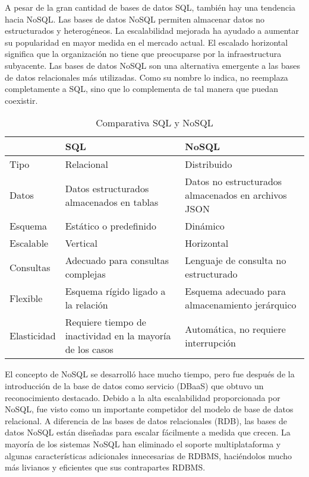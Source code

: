 A pesar de la gran cantidad de bases de datos SQL, también hay una tendencia hacia NoSQL. Las bases de datos NoSQL permiten almacenar datos no estructurados y heterogéneos. La \gls{escalabilidad} mejorada ha ayudado a aumentar su popularidad en mayor medida en el mercado actual. El escalado horizontal significa que la organización no tiene que preocuparse por la infraestructura subyacente. Las bases de datos NoSQL son una alternativa emergente a las bases de datos relacionales más utilizadas. Como su nombre lo indica, no reemplaza completamente a SQL, sino que lo complementa de tal manera que puedan coexistir.
\vspace{0.8cm}

\begin{table}[H]
  \renewcommand{\arraystretch}{1.5}
  \centering
  \scriptsize
  \begin{tabular}{ |p{2cm}||p{5cm}|p{5cm}|  }
    \hline
      & SQL
      & NoSQL \\
    \hline
    Tipo
      & Relacional
      & Distribuido \\
    \hline
    Datos
      & Datos estructurados almacenados en tablas 
      & Datos no estructurados almacenados en archivos JSON \\
    \hline
    Esquema 
      & Estático o predefinido
      & Dinámico \\
    \hline
    Escalable 
      & Vertical
      & Horizontal \\
    \hline
    Consultas
      & Adecuado para consultas complejas 
      & Lenguaje de consulta no estructurado \\
    \hline
    Flexible
      & Esquema rígido ligado a la relación 
      & Esquema adecuado para almacenamiento jerárquico \\
    \hline
    Elasticidad
      & Requiere tiempo de inactividad en la mayoría de los casos 
      & Automática, no requiere interrupción \\
    \hline
  \end{tabular}
  \caption{Comparativa SQL y NoSQL}
\end{table}
\vspace{0.8cm}

El concepto de NoSQL se desarrolló hace mucho tiempo, pero fue después de la introducción de la base de datos como servicio (DBaaS) que obtuvo un reconocimiento destacado. Debido a la alta \gls{escalabilidad} proporcionada por NoSQL, fue visto como un importante competidor del modelo de base de datos relacional. A diferencia de las bases de datos relacionales (RDB), las bases de datos NoSQL están diseñadas para escalar fácilmente a medida que crecen. La mayoría de los sistemas NoSQL han eliminado el soporte multiplataforma y algunas características adicionales innecesarias de RDBMS, haciéndolos mucho más livianos y eficientes que sus contrapartes RDBMS.


